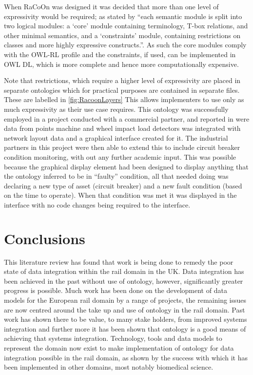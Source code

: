 When RaCoOn was designed it was decided that more than one level of expressivity would be required; as stated by \citet{Tutcher2015} ``each semantic module is split into two logical modules: a ‘core’ module containing terminology, T-box relations, and other minimal semantics, and a ‘constraints’ module, containing restrictions on classes and more highly expressive constructs.''. As such the core modules comply with the OWL-RL profile and the constraints, if used, can be implemented in OWL DL, which is more complete and hence more computationally expensive. 

Note that restrictions, which require a higher level of expressivity are placed in separate ontologies which for practical purposes are contained in separate files. These are labelled  in \autoref{fig:RacoonLayers} This allows implementers to use only as much expressivity as their use case requires. This ontology was successfully employed in a project conducted with a commercial partner, and reported in \citet{Tutcher2015a} were data from points machine and wheel impact load detectors was integrated with network layout data and a graphical interface created for it. The industrial partners in this project were then able to extend this to include circuit breaker condition monitoring, with out any further academic input. This was possible because the graphical display element had been designed to display anything that the ontology inferred to be in ``faulty'' condition, all that needed doing was declaring a new type of asset (circuit breaker) and a new fault condition (based on the time to operate). When that condition was met it was displayed in the interface with no code changes being required to the interface. 

\section{Conclusions}

This literature review has found that work is being done to remedy the poor state of data integration within the rail domain in the UK. Data integration has been achieved in the past without use of ontology, however, significantly greater progress is possible. Much work has been done on the development of data models for the European rail domain by a range of projects, the remaining issues are now centred around the take up and use of ontology in the rail domain. Past work has shown there to be value, to many stake holders, from improved systems integration and further more it has been shown that ontology is a good means of achieving that systems integration.  Technology, tools and data models to represent the domain now exist to make implementation of ontology for data integration possible in the rail domain, as shown by the success with which it has been implemented in other domains, most notably biomedical science. 